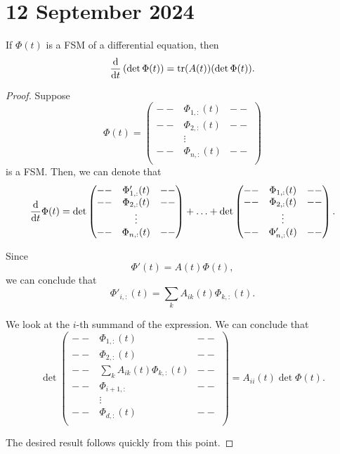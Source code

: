\documentclass{article}
\begin{document}
\section*{12 September 2024}
    \begin{theorem}{}
        
        If $\Phi(t)$ is a FSM of a differential equation, then 
        \[
            \dv{t} \left(\det \Phi(t)\right) = \tr(A(t)) (\det \Phi(t)).
        \]
    \end{theorem}
    \begin{proof}
        Suppose 
        \[
            \Phi(t) = 
            \begin{pmatrix}
                -- & \Phi_{1, :}(t) & -- \\
                -- & \Phi_{2, :}(t) & -- \\
                & \vdots & \\
                -- & \Phi_{n, :}(t) & -- \\
            \end{pmatrix}
        \]
        is a FSM. Then, we can denote that 
        \[
            \dv{t} \Phi(t) = 
            \det \begin{pmatrix}
                -- & \Phi'_{1, :}(t) & -- \\
                -- & \Phi_{2, :}(t) & -- \\
                & \vdots & \\
                -- & \Phi_{n, :}(t) & -- 
            \end{pmatrix} + \hdots + 
            \det \begin{pmatrix}
                -- & \Phi_{1, :}(t) & -- \\
                -- & \Phi_{2, :}(t) & -- \\
                & \vdots & \\
                -- & \Phi'_{n, :}(t) & -- 
            \end{pmatrix}.
        \]

        Since 
        \[
            \Phi'(t) = A(t) \Phi(t),
        \]
        we can conclude that 
        \[
            \Phi'_{i,:}(t) = \sum_{k} A_{ik} (t) \Phi_{k, :}(t).
        \]

        We look at the $i$-th summand of the expression. We can conclude that 
        \[
            \det \begin{pmatrix}
                -- & \Phi_{1, :}(t) & -- \\
                -- & \Phi_{2, :}(t) & -- \\
                -- & \sum_{k} A_{ik}(t) \Phi_{k, :}(t) & -- \\
                -- & \Phi_{i + 1, :} & -- \\
                & \vdots & \\
                -- & \Phi_{d, :}(t) & -- \\
            \end{pmatrix} = A_{ii}(t) \det \Phi(t).
        \]

        The desired result follows quickly from this point. 
    \end{proof}
\end{document}
